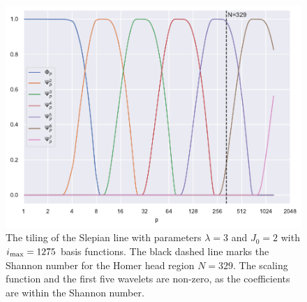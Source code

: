 \begin{figure}[htpb]
	\centering\capstart{}
	\includegraphics[width=\textwidth]{homer_slepian_tiling_b1275.pdf}
	\caption[
		The tiling of the Slepian line for the Homer head region
	]{
		The tiling of the Slepian line with parameters \(\lambda=3\) and \(J_{0}=2\) with \(i_{\text{max}}=\num{1275}\) basis functions.
		The black dashed line marks the Shannon number for the Homer head region \(N=329\).
		The scaling function and the first five wavelets are non-zero, as the coefficients are within the Shannon number.
	}\label{fig:chapter5_tiling}
\end{figure}
